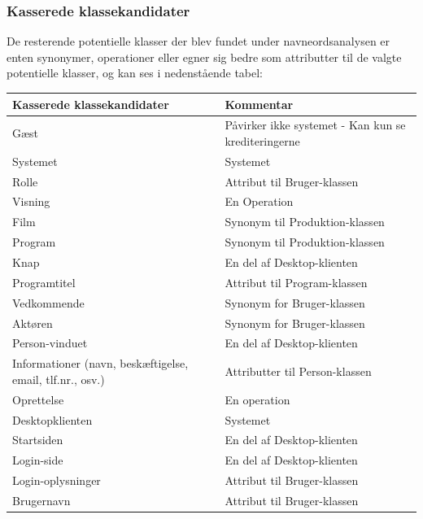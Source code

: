 \subsubsection{Kasserede klassekandidater}
De resterende potentielle klasser der blev fundet under navneordsanalysen er enten synonymer, operationer  eller egner sig bedre som attributter til de valgte potentielle klasser, og kan ses i nedenstående tabel: 

\begin{table}[H]
    \begin{tabularx}{\textwidth}{|X|X|}
        \hline
        \textbf{Kasserede klassekandidater} & \textbf{Kommentar} \\
        \hline
        Gæst & Påvirker ikke systemet - Kan kun se krediteringerne\\
        \hline
        Systemet & Systemet  \\
        \hline
        Rolle   & Attribut til Bruger-klassen\\
        \hline
        Visning  & En Operation\\
        \hline
        Film & Synonym til Produktion-klassen\\ 
        \hline
        Program & Synonym til Produktion-klassen\\ 
        \hline
        Knap & En del af Desktop-klienten\\
        \hline
        Programtitel & Attribut til Program-klassen\\
        \hline
        Vedkommende & Synonym for Bruger-klassen\\
        \hline
        Aktøren &  Synonym for Bruger-klassen\\
        \hline
        Person-vinduet & En del af Desktop-klienten\\
        \hline
        Informationer (navn, beskæftigelse, email, tlf.nr., osv.) &  Attributter til Person-klassen\\
        \hline
        Oprettelse & En operation \\
        \hline
        Desktopklienten &  Systemet\\
        \hline
        Startsiden &  En del af Desktop-klienten\\
        \hline
        Login-side & En del af Desktop-klienten\\
        \hline
        Login-oplysninger & Attribut til Bruger-klassen\\
        \hline
        Brugernavn & Attribut til Bruger-klassen\\

\end{tabularx}
\end{table}
